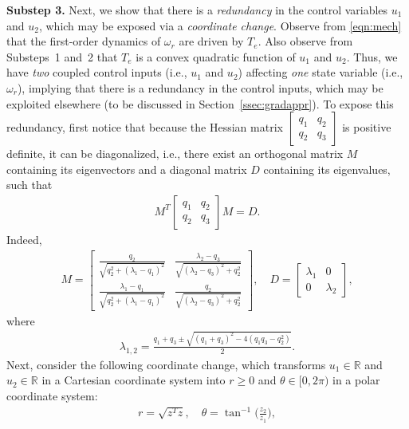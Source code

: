 \documentclass[journal]{IEEEtran}
\begin{document}
{\bf Substep 3.} Next, we show that there is a {\em redundancy} in the control variables $u_1$ and $u_2$, which may be exposed via a {\em coordinate change}. Observe from \eqref{eqn:mech} that the first-order dynamics of $\omega_r$ are driven by $T_e$. Also observe from Substeps~1 and~2 that $T_e$ is a convex quadratic function of $u_1$ and $u_2$. Thus, we have {\em two} coupled control inputs (i.e., $u_1$ and $u_2$) affecting {\em one} state variable (i.e., $\omega_r$), implying that there is a redundancy in the control inputs, which may be exploited elsewhere (to be discussed in Section~\ref{ssec:gradappr}). To expose this redundancy, first notice that because the Hessian matrix $\left[\begin{smallmatrix}
q_1 & q_2 \\
q_2 & q_3
\end{smallmatrix}\right]$ is positive definite, it can be diagonalized, i.e., there exist an orthogonal matrix $M$ containing its eigenvectors and a diagonal matrix $D$ containing its eigenvalues, such that
\begin{align}
M^T
\begin{bmatrix}
q_1 & q_2 \\
q_2 & q_3
\end{bmatrix}M=D.\label{eqn:diagonalization}
\end{align}
Indeed,
\begin{align*}
M=\begin{bmatrix}
\frac{q_2}{\sqrt{q_2^2+(\lambda_1-q_1)^2}} & \frac{\lambda_2-q_3}{\sqrt{(\lambda_2-q_3)^2+q_2^2}}\\
\frac{\lambda_1-q_1}{\sqrt{q_2^2+(\lambda_1-q_1)^2}} & \frac{q_2}{\sqrt{(\lambda_2-q_3)^2+q_2^2}}
\end{bmatrix},
\quad D=\begin{bmatrix}
\lambda_1 & 0\\
0 & \lambda_2
\end{bmatrix},
\end{align*}
where \begin{align*}
\lambda_{1,2}=\frac{q_1+q_3\pm\sqrt{(q_1+q_3)^2-4(q_1q_3-q_2^2)}}{2}.
\end{align*}
Next, consider the following coordinate change, which transforms $u_1 \in \mathbb{R}$ and $u_2 \in \mathbb{R}$ in a Cartesian coordinate system into $r \geq 0$ and $\theta \in [0, 2\pi)$ in a polar coordinate system:
\begin{align}
r=\sqrt{z^Tz},\quad\theta=\tan^{-1}\big(\frac{z_2}{z_1}\big),\label{eqn:ztheta}
\end{align}
\end{document}
